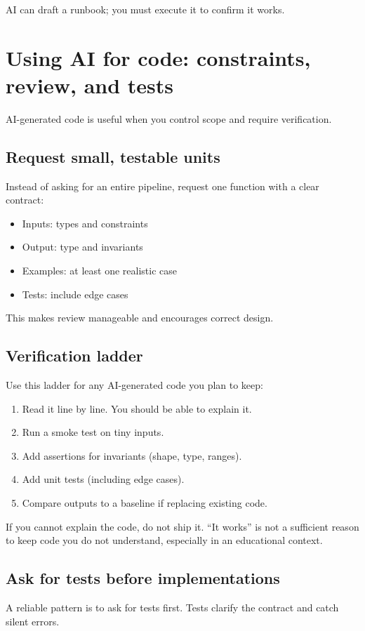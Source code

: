 AI can draft a runbook; you must execute it to confirm it works.

\section{Using AI for code: constraints, review, and tests}
AI-generated code is useful when you control scope and require verification.

\subsection{Request small, testable units}
Instead of asking for an entire pipeline, request one function with a clear contract:
\begin{itemize}[noitemsep]
  \item Inputs: types and constraints
  \item Output: type and invariants
  \item Examples: at least one realistic case
  \item Tests: include edge cases
\end{itemize}

This makes review manageable and encourages correct design.

\subsection{Verification ladder}
Use this ladder for any AI-generated code you plan to keep:
\begin{enumerate}[noitemsep]
  \item Read it line by line. You should be able to explain it.
  \item Run a smoke test on tiny inputs.
  \item Add assertions for invariants (shape, type, ranges).
  \item Add unit tests (including edge cases).
  \item Compare outputs to a baseline if replacing existing code.
\end{enumerate}

If you cannot explain the code, do not ship it. ``It works'' is not a sufficient reason to keep code you do not understand, especially in an educational context.

\subsection{Ask for tests before implementations}
A reliable pattern is to ask for tests first. Tests clarify the contract and catch silent errors.

